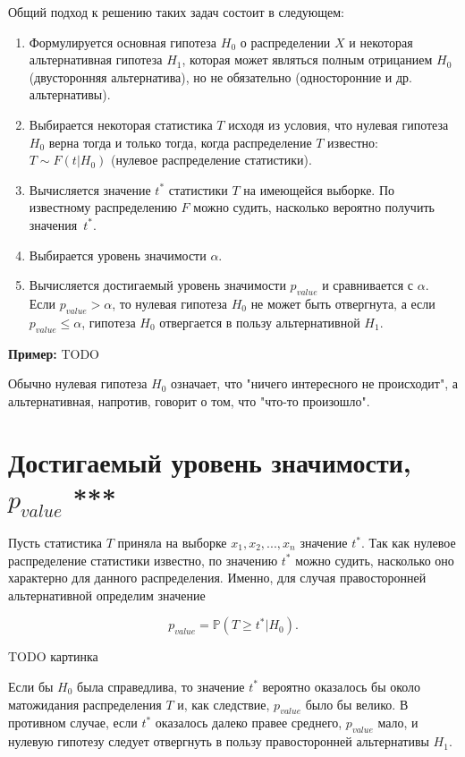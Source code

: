 Общий подход к решению таких задач состоит в следующем:
\begin{enumerate}
    \item Формулируется основная гипотеза $H_0$ о распределении $X$ и некоторая альтернативная гипотеза $H_1$, которая может являться полным отрицанием $H_0$ (двусторонняя альтернатива), но не обязательно (односторонние и др. альтернативы).
    \item Выбирается некоторая статистика $T$ исходя из условия, что нулевая гипотеза $H_0$ верна тогда и только тогда, когда распределение $T$ известно: $T \sim F(t|H_0)$ (нулевое распределение статистики). 
    \item Вычисляется значение $t^*$ статистики $T$ на имеющейся выборке. По известному распределению $F$ можно судить, насколько вероятно получить значения~$t^*$.
    \item Выбирается уровень значимости $\alpha$.
    \item Вычисляется достигаемый уровень значимости $p_{value}$ и сравнивается с $\alpha$. Если $p_{value} > \alpha$, то нулевая гипотеза $H_0$ не может быть отвергнута, а если $p_{value} \leqslant \alpha$, гипотеза $H_0$ отвергается в пользу альтернативной $H_1$.
\end{enumerate}

\textbf{Пример:} TODO

Обычно нулевая гипотеза $H_0$ означает, что "ничего интересного не происходит", а альтернативная, напротив, говорит о том, что "что-то произошло".

\section{Достигаемый уровень значимости, $p_{value}$ ***}

Пусть статистика $T$ приняла на выборке $x_1, x_2, ..., x_n$ значение $t^*$. Так как нулевое распределение статистики известно, по значению $t^*$ можно судить, насколько оно характерно для данного распределения. Именно, для случая правосторонней альтернативной определим значение

$$
p_{value} = \mathbb{P}(T \geqslant t^* | H_0).
$$

TODO картинка

Если бы $H_0$ была справедлива, то значение $t^*$ вероятно оказалось бы около матожидания распределения $T$ и, как следствие, $p_{value}$ было бы велико. В противном случае, если $t^*$ оказалось далеко правее среднего, $p_{value}$ мало, и нулевую гипотезу следует отвергнуть в пользу правосторонней альтернативы $H_1$.

